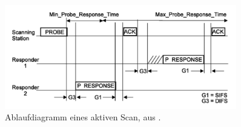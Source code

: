 \begin{figure}[h]
  \centering
	\includegraphics[width=0.9\textwidth]{images/activescan.png}
  \caption{Ablaufdiagramm eines aktiven Scan, aus \cite{ieee2012active}.}
  \label{fig:activescan}
\end{figure}


